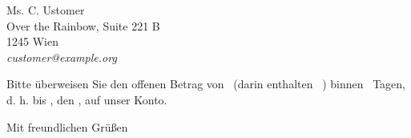\documentclass[fontsize=11pt,parskip=half]{scrlttr2}
\begin{document}
\begin{letter}{%
						Ms. C. Ustomer\\
						Over the Rainbow, Suite 221\kern 1pt B\\
						1245 Wien\\[1ex]
						\hfill\emph{customer@example.org}
	}


		Bitte überweisen Sie den offenen Betrag von 
		\Total\ (darin enthalten \TaxAmnt ~\TaxAbrv) 
		binnen \numberstringnum{\payperiod}~Tagen, d.\kern 1pt h. bis \DayName{\year}{\month}{\day+\payperiod}, den \duedate , auf unser Konto.

		\AdvanceDate[-\payperiod]				%


\def\amount				{12}				%

\renewcommand*{\raggedsignature}{\raggedright}

		\closing{Mit freundlichen Grüßen}

	\end{letter}
\end{document}
